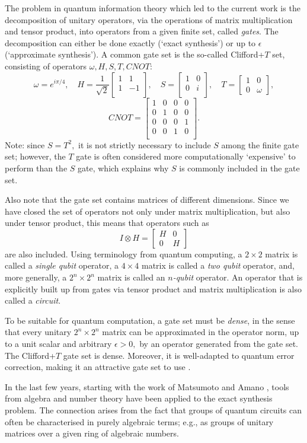 \documentclass{dalthesis}
\theoremstyle{theorem}
\theoremstyle{definition}
\theoremstyle{definition}  %
\theoremstyle{definition}
\newcommand{\CNOT}{\left[\begin{array}{cccc}
1&0&0&0\\
0&1&0&0\\
0&0&0&1\\
0&0&1&0\\
\end{array}\right]}
\newcommand{\Hadamard}{\frac{1}{\sqrt{2}}\left[\begin{array}{rr}
1&1\\
1&-1\\
\end{array}\right]}
\newcommand{\Phase}{\left[\begin{array}{cc}
1&0\\
0&i\\
\end{array}\right]}
\renewcommand{\:}{\mathbin{:}}
\begin{document}
The problem in quantum information theory which led to the current work is the decomposition of unitary operators, via the operations of matrix multiplication and tensor product, into operators from a given finite set, called \textit{gates}. The decomposition can either be done exactly (`exact synthesis') or up to $\epsilon$ (`approximate synthesis'). A common gate set is the so-called Clifford+$T$ set, consisting of operators $\omega, H, S, T, CNOT:$\[
\omega = e^{i\pi/4},\quad H = \Hadamard,\quad S = \Phase,\quad T =\left[\begin{array}{cc}
1&0\\
0&\omega
\end{array}
\right],\]\[ CNOT = \CNOT.
\]\label{page-intro}
Note: since $S = T^2,$ it is not strictly necessary to include $S$ among the finite gate set; however, the $T$ gate is often considered more computationally `expensive' to perform than the $S$ gate, which explains why $S$ is commonly included in the gate set.

Also note that the gate set contains matrices of different dimensions. Since we have closed the set of operators not only under matrix multiplication, but also under tensor product, this means that operators such as 
\[ I\otimes H = \left[\begin{array}{c|c}H&0\\\hline0&H\end{array}\right]
\]
are also included. Using terminology from quantum computing, a $2\times2$ matrix is called a \textit{single qubit} operator, a $4\times4$ matrix is called a \textit{two qubit} operator, and, more generally, a $2^n\times2^n$ matrix is called an \textit{$n$-qubit} operator. An operator that is explicitly built up from gates via tensor product and matrix multiplication is also called a {\em circuit}.

To be suitable for quantum computation, a gate set must be \textit{dense}, in the sense that every unitary $2^n\times 2^n$ matrix can be approximated in the operator norm, up to a unit scalar and arbitrary $\epsilon>0,$ by an operator generated from the gate set. The Clifford+$T$ gate set is dense. Moreover, it is well-adapted to quantum error correction, making it an attractive gate set to use {\cite{Nielsen-Chuang}}.

In the last few years, starting with the work of Matsumoto and Amano {\cite{MATS-AMAN}}, tools from algebra and number theory have been applied to the exact synthesis problem. The connection arises from the fact that groups of quantum circuits can often be characterised in purely algebraic terms; e.g., as groups of unitary matrices over a given ring of algebraic numbers. 
\end{document}
